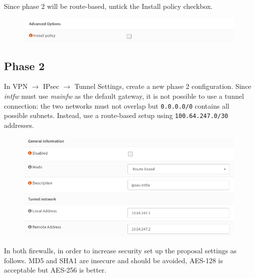 \documentclass{homework}
\newcommand{\intfw}{\textit{intfw}\xspace}
\newcommand{\mainfw}{\textit{mainfw}\xspace}
\begin{document}
    \vspace{-10pt}
%
    Since phase 2 will be route-based, untick the Install policy checkbox.
    \vspace{-5pt}
    \begin{figure}[H]
        \centering
        \includegraphics[width=\linewidth]{ipsec/phase1-advanced}
        \label{fig:ipsec-phase1-advanced}
    \end{figure}
    
    \subsection{Phase 2}
    In VPN $\rightarrow$ IPsec $\rightarrow$ Tunnel Settings, create a new phase 2 configuration.
    Since \intfw must use \mainfw as the default gateway, it is not possible to use a tunnel connection: the two networks must not overlap but \texttt{0.0.0.0/0} contains all possible subnets.
    Instead, use a route-based setup using \texttt{100.64.247.0/30} addresses.
    \begin{figure}[H]
        \centering
        \includegraphics[width=\linewidth]{ipsec/phase2-general}
        \label{fig:ipsec-phase2-general}
    \end{figure}
%
    In both firewalls, in order to increase security set up the proposal settings as follows.
    MD5 and SHA1 are insecure and should be avoided, AES-128 is acceptable but AES-256 is better.
\end{document}
